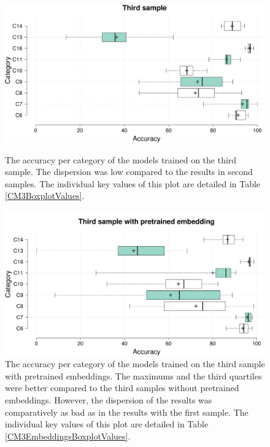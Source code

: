\begin{figure}[]
 \begin{minipage}[t]{\textwidth}
    \centering
    \includegraphics[width =\textwidth]{Images/CM3Boxplot.png}
    \caption{The accuracy per category of the models trained on the third sample. The dispersion was low compared to the results in second samples. The individual key values of this plot are detailed in Table \ref{CM3BoxplotValues}.}
    \label{CM3Boxplot}
\end{minipage}

 \begin{minipage}[b]{\textwidth}
    \centering
    \includegraphics[width =\textwidth]{Images/CM3EmbeddingsBoxplot.png}
    \caption{The accuracy per category of the models trained on the third sample with pretrained embeddings. The maximums and the third quartiles were better compared to the third samples without pretrained embeddings. However, the dispersion of the results was comparatively as bad as in the results with the first sample. The individual key values of this plot are detailed in Table \ref{CM3EmbeddingsBoxplotValues}.}
    \label{CM3EmbeddingsBoxplot}
\end{minipage}
\end{figure} \hfill

